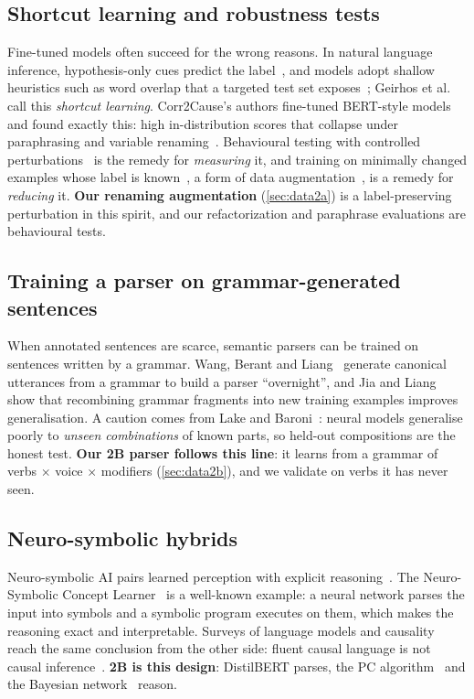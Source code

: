\documentclass[12pt,a4paper]{article}
\begin{document}
\subsection{Shortcut learning and robustness tests}
Fine-tuned models often succeed for the wrong reasons. In natural language inference, hypothesis-only cues predict the
label~\cite{gururangan2018}, and models adopt shallow heuristics such as word overlap that a targeted test set
exposes~\cite{mccoy2019}; Geirhos et al.~\cite{geirhos2020} call this \emph{shortcut learning}. Corr2Cause's authors fine-tuned
BERT-style models and found exactly this: high in-distribution scores that collapse under paraphrasing and variable
renaming~\cite{jin2024corr2cause}. Behavioural testing with controlled perturbations~\cite{ribeiro2020} is the remedy for
\emph{measuring} it, and training on minimally changed examples whose label is known~\cite{kaushik2020}, a form of data
augmentation~\cite{wei2019}, is a remedy for \emph{reducing} it. \textbf{Our renaming augmentation} (\cref{sec:data2a}) is a
label-preserving perturbation in this spirit, and our refactorization and paraphrase evaluations are behavioural tests.

\subsection{Training a parser on grammar-generated sentences}
When annotated sentences are scarce, semantic parsers can be trained on sentences written by a grammar. Wang, Berant and
Liang~\cite{wang2015} generate canonical utterances from a grammar to build a parser ``overnight'', and Jia and
Liang~\cite{jia2016} show that recombining grammar fragments into new training examples improves generalisation. A caution
comes from Lake and Baroni~\cite{lake2018}: neural models generalise poorly to \emph{unseen combinations} of known parts,
so held-out compositions are the honest test. \textbf{Our 2B parser follows this line}: it learns from a grammar of
verbs $\times$ voice $\times$ modifiers (\cref{sec:data2b}), and we validate on verbs it has never seen.

\subsection{Neuro-symbolic hybrids}
Neuro-symbolic AI pairs learned perception with explicit reasoning~\cite{garcez2023}. The Neuro-Symbolic Concept
Learner~\cite{mao2019} is a well-known example: a neural network parses the input into symbols and a symbolic program
executes on them, which makes the reasoning exact and interpretable. Surveys of language models and causality reach the
same conclusion from the other side: fluent causal language is not causal inference~\cite{kiciman2023}. \textbf{2B is
this design}: DistilBERT parses, the PC algorithm~\cite{spirtes2000,meek1995} and the Bayesian network~\cite{pearl1988,pearl2009}
reason.
\end{document}
